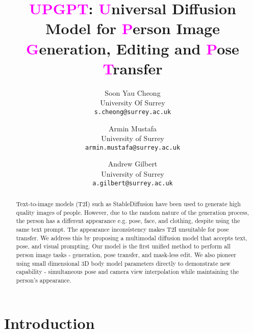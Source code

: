 \documentclass[10pt,twocolumn,letterpaper]{article}
\begin{document}
\captionsetup[subfigure]{skip=0pt}
\title{\textcolor{magenta}{UPGPT}: \textcolor{magenta}{U}niversal Diffusion Model for \textcolor{magenta}{P}erson Image \textcolor{magenta}{G}eneration, Editing and \textcolor{magenta}{P}ose \textcolor{magenta}{T}ransfer} 


\author{Soon Yau Cheong\\
University Of Surrey\\
{\tt\small s.cheong@surrey.ac.uk}
\and
Armin Mustafa\\
University of Surrey\\
{\tt\small armin.mustafa@surrey.ac.uk}
\and
Andrew Gilbert\\
University of Surrey\\
{\tt\small a.gilbert@surrey.ac.uk}
}

\maketitle






\begin{abstract}
Text-to-image models (T2I) such as StableDiffusion have been used to generate high quality images of people. However, due to the random nature of the generation process, the person has a different appearance e.g. pose, face, and clothing, despite using the same text prompt. The appearance inconsistency makes T2I unsuitable for pose transfer. We address this by proposing a multimodal diffusion model that accepts text, pose, and visual prompting. Our model is the first unified method to perform all person image tasks - generation, pose transfer, and mask-less edit. We also pioneer using small dimensional 3D body model parameters directly to demonstrate new capability - simultaneous pose and camera view interpolation while maintaining the person's appearance. 

\end{abstract}
\section{Introduction}
\end{document}
